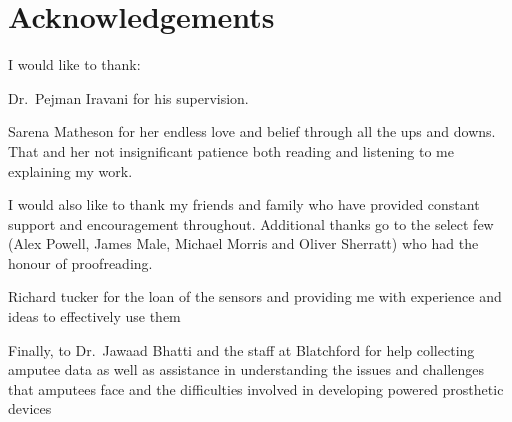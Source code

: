 \chapter*{Acknowledgements}

I would like to thank:

Dr.~Pejman Iravani for his supervision.%

Sarena Matheson for her endless love and belief through all the ups and downs. That and her not insignificant patience both reading and listening to me explaining my work.

I would also like to thank my friends and family who have provided constant support and encouragement throughout. Additional thanks go to the select few (Alex Powell, James Male, Michael Morris and Oliver Sherratt) who had the honour of proofreading.

Richard tucker for the loan of the sensors and providing me with experience and ideas to effectively use them 

Finally, to Dr.~Jawaad Bhatti and the staff at Blatchford for help collecting amputee data as well as assistance in understanding the issues and challenges that amputees face and the difficulties involved in developing powered prosthetic devices